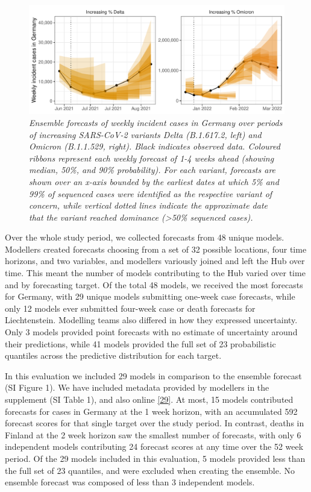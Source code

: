 \documentclass[
]{article}
\begin{document}
\begin{figure}
\centering
\includegraphics{latest_files/figure-latex/example-ensemble-1.pdf}
\caption{\label{fig:example-ensemble}\emph{Ensemble forecasts of weekly incident cases in Germany over periods of increasing SARS-CoV-2 variants Delta (B.1.617.2, left) and Omicron (B.1.1.529, right). Black indicates observed data. Coloured ribbons represent each weekly forecast of 1-4 weeks ahead (showing median, 50\%, and 90\% probability). For each variant, forecasts are shown over an x-axis bounded by the earliest dates at which 5\% and 99\% of sequenced cases were identified as the respective variant of concern, while vertical dotted lines indicate the approximate date that the variant reached dominance (\textgreater50\% sequenced cases).}}
\end{figure}

Over the whole study period, we collected forecasts from 48 unique models. Modellers created forecasts choosing from a set of 32 possible locations, four time horizons, and two variables, and modellers variously joined and left the Hub over time. This meant the number of models contributing to the Hub varied over time and by forecasting target. Of the total 48 models, we received the most forecasts for Germany, with 29 unique models submitting one-week case forecasts, while only 12 models ever submitted four-week case or death forecasts for Liechtenstein. Modelling teams also differed in how they expressed uncertainty. Only 3 models provided point forecasts with no estimate of uncertainty around their predictions, while 41 models provided the full set of 23 probabilistic quantiles across the predictive distribution for each target.

In this evaluation we included 29 models in comparison to the ensemble forecast (SI Figure 1). We have included metadata provided by modellers in the supplement (SI Table 1), and also online \protect\hyperlink{ref-katharine_sherratt_2022_7356267}{{[}29{]}}. At most, 15 models contributed forecasts for cases in Germany at the 1 week horizon, with an accumulated 592 forecast scores for that single target over the study period. In contrast, deaths in Finland at the 2 week horizon saw the smallest number of forecasts, with only 6 independent models contributing 24 forecast scores at any time over the 52 week period. Of the 29 models included in this evaluation, 5 models provided less than the full set of 23 quantiles, and were excluded when creating the ensemble. No ensemble forecast was composed of less than 3 independent models.
\end{document}

